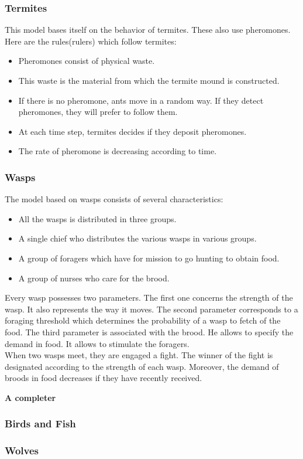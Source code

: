 \newpage
\subsubsection{Termites}
This model bases itself on the behavior of termites. These also use pheromones. Here are the rules(rulers) which follow termites:
\begin{itemize}
\item Pheromones consist of physical waste.
\item This waste is the material from which the termite mound is constructed.
\item If there is no pheromone, ants move in a random way. If they detect pheromones, they will prefer to follow them.
\item At each time step, termites decides if they deposit pheromones.
\item The rate of pheromone is decreasing according to time.
\end{itemize} 

\newpage
\subsubsection{Wasps}

The model based on wasps consists of several characteristics:
\begin{itemize}
\item All the wasps is distributed in three groups.
\item A single chief who distributes the various wasps in various groups.
\item A group of foragers which have for mission to go hunting to obtain food.
\item A group of nurses who care for the brood.\\
\end{itemize}

Every wasp possesses two parameters. The first one concerns the strength of the wasp. It also represents the way it moves. The second parameter corresponds to a foraging threshold which determines the probability of a wasp to fetch of the food. The third parameter is associated with the brood. He allows to specify the demand in food. It allows to stimulate the foragers.\\
When two wasps meet, they are engaged a fight. 
The winner of the fight is designated according to the strength of each wasp. Moreover, the demand of broods in food decreases if they have recently received.

\textbf{A completer}


\newpage
\subsubsection{Birds and Fish}

\newpage
\subsubsection{Wolves}
